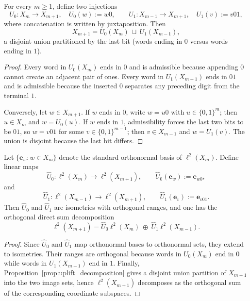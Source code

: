 \begin{proposition}
\label{prop:uplift_decomposition}
For every $m\ge 1$, define two injections
\[
U_0:X_m\to X_{m+1},\quad U_0(w):=w0,
\qquad
U_1:X_{m-1}\to X_{m+1},\quad U_1(v):=v01,
\]
where concatenation is written by juxtaposition.
Then
\[
X_{m+1}=U_0(X_m)\ \sqcup\ U_1(X_{m-1}),
\]
a disjoint union partitioned by the last bit (words ending in $0$ versus words ending in $1$).
\end{proposition}

\begin{proof}
Every word in $U_0(X_m)$ ends in $0$ and is admissible because appending $0$ cannot create an adjacent pair of ones.
Every word in $U_1(X_{m-1})$ ends in $01$ and is admissible because the inserted $0$ separates any preceding digit from the terminal $1$.

Conversely, let $w\in X_{m+1}$.
If $w$ ends in $0$, write $w=u0$ with $u\in\{0,1\}^{m}$; then $u\in X_m$ and $w=U_0(u)$.
If $w$ ends in $1$, admissibility forces the last two bits to be $01$, so $w=v01$ for some $v\in\{0,1\}^{m-1}$; then $v\in X_{m-1}$ and $w=U_1(v)$.
The union is disjoint because the last bit differs.
\end{proof}

\begin{proposition}
\label{prop:uplift_isometries}
Let $\{\mathbf{e}_w:w\in X_m\}$ denote the standard orthonormal basis of $\ell^2(X_m)$.
Define linear maps
\[
\widehat{U}_0:\ell^2(X_m)\to \ell^2(X_{m+1}),\qquad \widehat{U}_0(\mathbf{e}_w):=\mathbf{e}_{w0},
\]
and
\[
\widehat{U}_1:\ell^2(X_{m-1})\to \ell^2(X_{m+1}),\qquad \widehat{U}_1(\mathbf{e}_v):=\mathbf{e}_{v01}.
\]
Then $\widehat{U}_0$ and $\widehat{U}_1$ are isometries with orthogonal ranges, and one has the orthogonal direct sum decomposition
\[
\ell^2(X_{m+1})=\widehat{U}_0\ell^2(X_m)\ \oplus\ \widehat{U}_1\ell^2(X_{m-1}).
\]
\end{proposition}

\begin{proof}
Since $\widehat{U}_0$ and $\widehat{U}_1$ map orthonormal bases to orthonormal sets, they extend to isometries.
Their ranges are orthogonal because words in $U_0(X_m)$ end in $0$ while words in $U_1(X_{m-1})$ end in $1$.
Finally, Proposition~\ref{prop:uplift_decomposition} gives a disjoint union partition of $X_{m+1}$ into the two image sets, hence $\ell^2(X_{m+1})$ decomposes as the orthogonal sum of the corresponding coordinate subspaces.
\end{proof}

